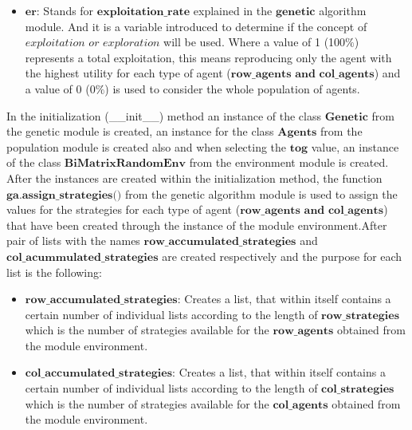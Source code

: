 \documentclass{article}
\begin{document}
\begin{itemize}
	\item $\textbf{er:}$ Stands for $\textbf{exploitation\_rate}$ explained in the $\textbf{genetic}$ algorithm module. And it is a variable introduced to determine if the concept of $\textit{exploitation or exploration}$ will be used. Where a value of 1 (100$\%$) represents a total exploitation, this means reproducing only the agent with the highest utility for each type of agent ($\textbf{row\_agents and col\_agents}$) and a value of 0 (0$\%$) is used to consider the whole population of agents.
\end{itemize}

In the initialization (\_\_init\_\_) method an instance of the class $\textbf{Genetic}$ from the genetic module is created, an instance for the class $\textbf{Agents}$ from the population module is created also and when selecting the $\textbf{tog}$ value, an instance of the class $\textbf{BiMatrixRandomEnv}$ from the environment module is created. After the instances are created within the initialization method, the function $\textbf{ga.assign\_strategies()}$ from the genetic algorithm module is used to assign the values for the strategies for each type of agent ($\textbf{row\_agents and col\_agents}$) that have been created through the instance of the module environment.After pair of lists with the names $\textbf{row\_accumulated\_strategies}$ and $\textbf{col\_acummulated\_strategies}$ are created respectively and the purpose for each list is the following:

\begin{itemize}
	\item$\textbf{row\_accumulated\_strategies}$: Creates a list, that within itself contains a certain number of individual lists according to the length of $\textbf{row\_strategies}$ which is the number of strategies available for the $\textbf{row\_agents}$ obtained from the module environment.
	\item$\textbf{col\_accumulated\_strategies}$: Creates a list, that within itself contains a certain number of individual lists according to the length of $\textbf{col\_strategies}$ which is the number of strategies available for the $\textbf{col\_agents}$ obtained from the module environment.

\end{itemize}
\end{document}
